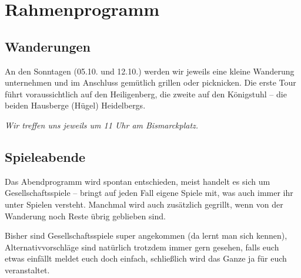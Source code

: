 \section{Rahmenprogramm}
\subsection{Wanderungen}
An den Sonntagen (05.10. und 12.10.) werden wir jeweils eine kleine Wanderung unternehmen und im Anschluss gemütlich grillen oder picknicken. Die erste Tour führt voraussichtlich auf den Heiligenberg, die zweite auf den Königstuhl -- die beiden Hausberge (Hügel) Heidelbergs. %

\noindent\emph{Wir treffen uns jeweils um 11 Uhr am Bismarckplatz.}

\subsection{Spieleabende}
Das Abendprogramm wird spontan entschieden, meist handelt es sich um Gesellschaftsspiele -- bringt auf jeden Fall eigene Spiele mit, was auch immer ihr unter Spielen versteht. Manchmal wird auch zusätzlich gegrillt, wenn von der Wanderung noch Reste übrig geblieben sind.

Bisher sind Gesellschaftsspiele super angekommen (da lernt man sich kennen), Alternativvorschläge sind natürlich trotzdem immer gern gesehen, falls euch etwas einfällt meldet euch doch einfach, schließlich wird das Ganze ja für euch veranstaltet.


\iffalse
